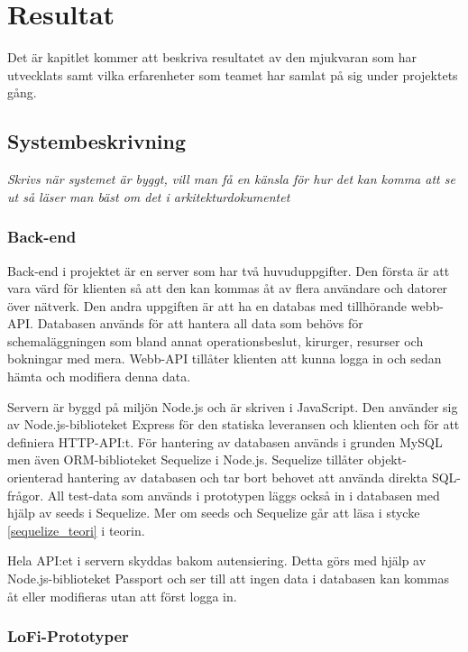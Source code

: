 \chapter{Resultat}
Det är kapitlet kommer att beskriva resultatet av den mjukvaran som har utvecklats samt vilka erfarenheter som
teamet har samlat på sig under projektets gång.

\section{Systembeskrivning}
\textit{Skrivs när systemet är byggt, vill man få en känsla för hur det kan
komma att se ut så läser man bäst om det i arkitekturdokumentet}

\subsection{Back-end}
Back-end i projektet är en server som har två huvuduppgifter. Den första är att vara värd för klienten så att den kan kommas åt av flera användare och datorer över nätverk. Den andra uppgiften är att ha en databas med tillhörande webb-API. Databasen används för att hantera all data som behövs för schemaläggningen som bland annat operationsbeslut, kirurger, resurser och bokningar med mera. Webb-API tillåter klienten att kunna logga in och sedan hämta och modifiera denna data.

Servern är byggd på miljön Node.js och är skriven i JavaScript. Den använder sig av Node.js-biblioteket Express för den statiska leveransen och klienten och för att definiera HTTP-API:t. För hantering av databasen används i grunden MySQL men även ORM-biblioteket Sequelize i Node.js. Sequelize tillåter objekt-orienterad hantering av databasen och tar bort behovet att använda direkta SQL-frågor. All test-data som används i prototypen läggs också in i databasen med hjälp av seeds i Sequelize. Mer om seeds och Sequelize går att läsa i stycke \ref{sequelize_teori} i teorin.

Hela API:et i servern skyddas bakom autensiering. Detta görs med hjälp av Node.js-biblioteket Passport och ser till att ingen data i databasen kan kommas åt eller modifieras utan att först logga in.

\subsection{LoFi-Prototyper}

